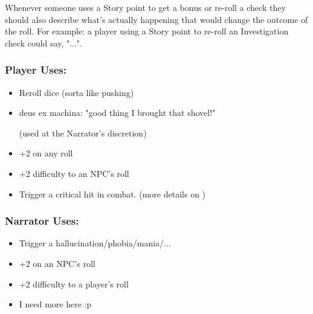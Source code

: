 Whenever someone uses a Story point to get a bonus or re-roll a check 
they should also describe what's actually happening that would change the outcome of the roll.
For example: a player using a Story point to re-roll an Investigation check could say, 
"...".

\subsubsection{Player Uses:}
\begin{itemize}[topsep=0pt]
    \item Reroll dice (sorta like pushing)
    \item deus ex machina: "good thing I brought that shovel!" \par(used at the Narrator's discretion)
    \item +2 on any roll
    \item +2 difficulty to an NPC's roll
    \item Trigger a critical hit in combat. (more details on )
\end{itemize}

\subsubsection{Narrator Uses:}
\begin{itemize}[topsep=0pt]
    \item Trigger a hallucination/phobia/mania/...
    \item +2 on an NPC's roll
    \item +2 difficulty to a player's roll
    \item I need more here :p
\end{itemize}


